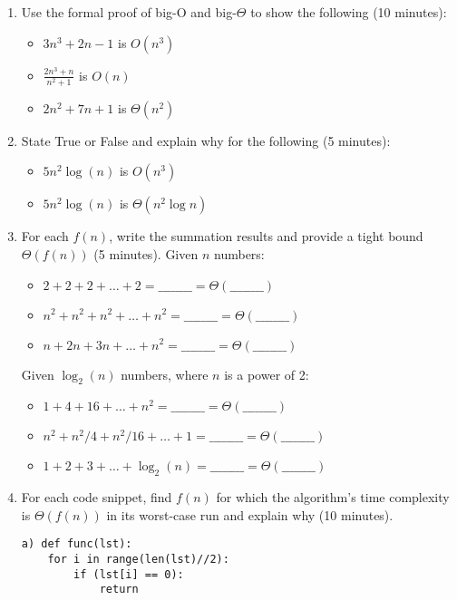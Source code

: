 \documentclass{article}
\begin{document}
\begin{enumerate}
    \item Use the formal proof of big-O and big-$\Theta$ to show the following (10 minutes):
    \begin{itemize}
        \item $3n^3 + 2n - 1$ is $O(n^3)$
        \item $\frac{2n^3 + n}{n^2 + 1}$ is $O(n)$
        \item $2n^2 + 7n + 1$ is $\Theta(n^2)$
    \end{itemize}
    \item State True or False and explain why for the following (5 minutes):
    \begin{itemize}
        \item $5n^2 \log(n)$ is $O(n^3)$
        \item $5n^2 \log(n)$ is $\Theta(n^2 \log n)$
    \end{itemize}
    \item For each $f(n)$, write the summation results and provide a tight bound $\Theta(f(n))$ (5 minutes).  Given $n$ numbers:
    \begin{itemize}
        \item $2 + 2 + 2 + \dots + 2 = \_\_\_\_\_\_\_\_ = \Theta(\_\_\_\_\_\_\_\_)$
        \item $n^2 + n^2 + n^2 + \dots + n^2 = \_\_\_\_\_\_\_\_ = \Theta(\_\_\_\_\_\_\_\_)$
        \item $n + 2n + 3n + \dots + n^2 = \_\_\_\_\_\_\_\_ = \Theta(\_\_\_\_\_\_\_\_)$
    \end{itemize}
    Given $\log_2(n)$ numbers, where $n$ is a power of 2:
    \begin{itemize}
        \item $1 + 4 + 16 + \dots + n^2 = \_\_\_\_\_\_\_\_ = \Theta(\_\_\_\_\_\_\_\_)$
        \item $n^2 + n^2/4 + n^2/16 + \dots + 1 = \_\_\_\_\_\_\_\_ = \Theta(\_\_\_\_\_\_\_\_)$
        \item $1 + 2 + 3 + \dots + \log_2(n) = \_\_\_\_\_\_\_\_ = \Theta(\_\_\_\_\_\_\_\_)$
    \end{itemize}
    \item For each code snippet, find $f(n)$ for which the algorithm's time complexity is $\Theta(f(n))$ in its worst-case run and explain why (10 minutes).
    \begin{verbatim}
a) def func(lst):
    for i in range(len(lst)//2):
        if (lst[i] == 0):
            return


\end{verbatim}
\end{enumerate}
\end{document}
